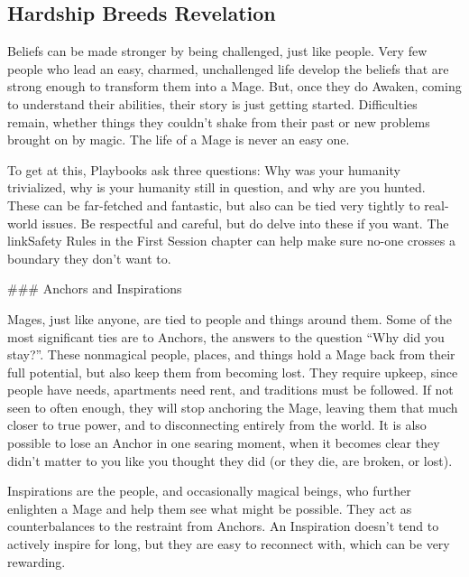\documentclass[
  oneside,
  statementpaper,
  9pt]{memoir}
\begin{document}
\hypertarget{hardship-breeds-revelation}{%
\subsection{Hardship Breeds
Revelation}\label{hardship-breeds-revelation}}

\begin{Narrator}

Beliefs can be made stronger by being challenged, just like people. Very few people who lead an easy, charmed, unchallenged life develop the beliefs that are strong enough to transform them into a Mage. But, once they do Awaken, coming to understand their abilities, their story is just getting started. Difficulties remain, whether things they couldn’t shake from their past or new problems brought on by magic. The life of a Mage is never an easy one.

To get at this, Playbooks ask three questions: Why was your humanity trivialized, why is your humanity still in question, and why are you hunted. These can be far-fetched and fantastic, but also can be tied very tightly to real-world issues. Be respectful and careful, but do delve into these if you want. The {{linkSafety Rules}} in the First Session chapter can help make sure no-one crosses a boundary they don’t want to.


### Anchors and Inspirations

Mages, just like anyone, are tied to people and things around them. Some of the most significant ties are to Anchors, the answers to the question “Why did you stay?”. These nonmagical people, places, and things hold a Mage back from their full potential, but also keep them from becoming lost. They require upkeep, since people have needs, apartments need rent, and traditions must be followed. If not seen to often enough, they will stop anchoring the Mage, leaving them that much closer to true power, and to disconnecting entirely from the world. It is also possible to lose an Anchor in one searing moment, when it becomes clear they didn’t matter to you like you thought they did (or they die, are broken, or lost).

Inspirations are the people, and occasionally magical beings, who further enlighten a Mage and help them see what might be possible. They act as counterbalances to the restraint from Anchors. An Inspiration doesn’t tend to actively inspire for long, but they are easy to reconnect with, which can be very rewarding.

\end{Narrator}
\end{document}
